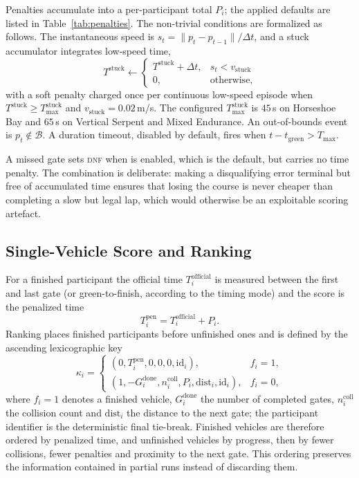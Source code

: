 

Penalties accumulate into a per-participant total $P_i$; the applied defaults are
listed in Table~\ref{tab:penalties}. The non-trivial conditions are formalized as
follows. The instantaneous speed is $s_t=\lVert p_t-p_{t-1}\rVert/\Delta t$, and a
stuck accumulator integrates low-speed time,
\begin{equation}
\label{eq:stuck}
T^{\mathrm{stuck}}\!\leftarrow\!\begin{cases} T^{\mathrm{stuck}}+\Delta t, & s_t<v_{\mathrm{stuck}}\\ 0, & \text{otherwise,}\end{cases}
\end{equation}
with a soft penalty charged once per continuous low-speed episode when
$T^{\mathrm{stuck}}\ge T^{\mathrm{stuck}}_{\max}$ and
$v_{\mathrm{stuck}}=0.02$\,m/s. The configured $T^{\mathrm{stuck}}_{\max}$ is
$45$\,s on Horseshoe Bay and $65$\,s on Vertical Serpent and Mixed Endurance. An
out-of-bounds event is $p_t\notin\mathcal{B}$. A duration timeout, disabled by
default, fires when $t-t_{\mathrm{green}}>T_{\max}$.

A missed gate sets \textsc{dnf} when  is enabled, which is
the default, but carries no time penalty. The combination is deliberate: making a
disqualifying error terminal but free of accumulated time ensures that losing the
course is never cheaper than completing a slow but legal lap, which would
otherwise be an exploitable scoring artefact.

\subsection{Single-Vehicle Score and Ranking}

For a finished participant the official time $T_i^{\mathrm{official}}$ is measured
between the first and last gate (or green-to-finish, according to the timing
mode) and the score is the penalized time
\begin{equation}
\label{eq:penalized}
T_i^{\mathrm{pen}}=T_i^{\mathrm{official}}+P_i .
\end{equation}
Ranking places finished participants before unfinished ones and is defined by the
ascending lexicographic key
\begin{equation}
\label{eq:ranking}
\kappa_i=\begin{cases}
(0,T_i^{\mathrm{pen}},0,0,0,\mathrm{id}_i), & f_i=1,\\
(1,-G_i^{\mathrm{done}},n_i^{\mathrm{coll}},P_i,\mathrm{dist}_i,\mathrm{id}_i), & f_i=0,
\end{cases}
\end{equation}
where $f_i=1$ denotes a finished vehicle, $G_i^{\mathrm{done}}$ the number of
completed gates, $n_i^{\mathrm{coll}}$ the collision count and $\mathrm{dist}_i$
the distance to the next gate; the participant identifier is the deterministic
final tie-break. Finished vehicles are therefore ordered by penalized time, and
unfinished vehicles by progress, then by fewer collisions, fewer penalties and
proximity to the next gate. This ordering preserves the information contained in
partial runs instead of discarding them.

